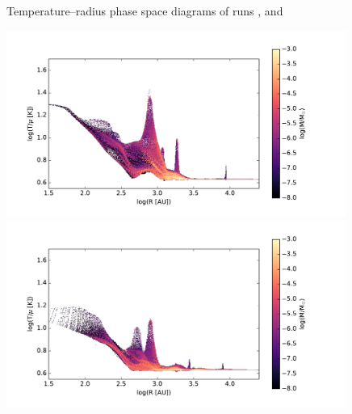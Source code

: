 \begin{figure}[!htb]
 \captionsetup{justification=justified,singlelinecheck=false,width=\linewidth}
 \decoRule
 \caption[ T--R phase diagrams]{Temperature--radius phase space diagrams of runs ,  and }
\label{fig:c0.1_T_R_larson}
\end{figure}
\FloatBarrier

\begin{figure}[!htb]
 \centering
 \includegraphics[width=0.99\textwidth]{Figures/var_rt_larson_plots/temp_R_hist_n100c1}
 \includegraphics[width=0.99\textwidth]{Figures/var_rt_larson_plots/temp_R_hist_n10c1}

\end{figure}
